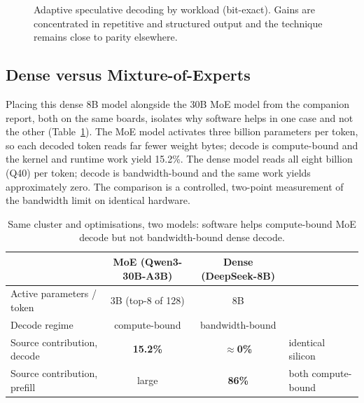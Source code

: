 \documentclass[10pt,a4paper]{article}
\begin{document}
\begin{figure}[H]
\centering
{}
\caption{Adaptive speculative decoding by workload (bit-exact). Gains are concentrated in repetitive and structured output and the technique remains close to parity elsewhere.}
\label{fig:spec}
\end{figure}

\subsection{Dense versus Mixture-of-Experts}
\label{sec:contrast}
Placing this dense 8B model alongside the 30B MoE model from the companion report, both on the same boards, isolates why software helps in one case and not the other (Table~\ref{tab:contrast}). The MoE model activates three billion parameters per token, so each decoded token reads far fewer weight bytes; decode is compute-bound and the kernel and runtime work yield 15.2\%. The dense model reads all eight billion (Q40) per token; decode is bandwidth-bound and the same work yields approximately zero. The comparison is a controlled, two-point measurement of the bandwidth limit on identical hardware.

\begin{table}[H]
\centering\small
\caption{Same cluster and optimisations, two models: software helps compute-bound MoE decode but not bandwidth-bound dense decode.}
\label{tab:contrast}
\begin{tabularx}{\textwidth}{p{4.8cm}cc X}
\toprule
 & \textbf{MoE (Qwen3-30B-A3B)} & \textbf{Dense (DeepSeek-8B)} & \\
\midrule
Active parameters / token & 3B (top-8 of 128) & 8B & \\
Decode regime & compute-bound & bandwidth-bound & \\
Source contribution, decode & \textbf{15.2\%} & \textbf{$\approx$0\%} & identical silicon \\
Source contribution, prefill & large & \textbf{86\%} & both compute-bound \\
\bottomrule
\end{tabularx}
\end{table}
\end{document}
